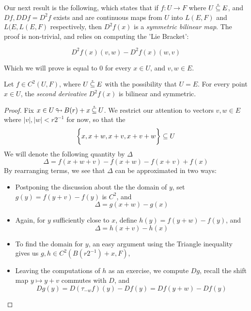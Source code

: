 \documentclass[../main-manifolds.tex]{subfiles}
\begin{document}
Our next result is the following, which states that if $f: U\to F$ where $U\:\mathring{\subseteq}\: E$, and $Df, DDf = D^2f$ exists and are continuous maps from $U$ into $L(E,F)$ and $L(E,L(E,F)$ respectively, then $D^2f(x)$ is a \emph{symmetric bilinear map}. The proof is non-trivial, and relies on computing the 'Lie Bracket':

\[
    D^2f(x)(v,w) - D^2f(x)(w,v)
\]

Which we will prove is equal to $0$ for every $x\in U$, and $v,w\in E$.

\begin{wts}
    Let $f\in C^2(U, F)$, where $U\:\mathring{\subseteq}\: E$ with the possibility that $U = E$. For every point $x\in U$, the \emph{second derivative} $D^2f(x)$ is bilinear and symmetric.
\end{wts}
\begin{proof}
    Fix $x\in U{\:\looparrowright\:} B(r) + x\:\mathring{\subseteq}\: U$. We restrict our attention to vectors $v,w\in E$ where $\vert v\vert, \vert w\vert < r2^{-1}$ for now, so that the
    \[
    \biggl\{{x, x+w, x+v, x+v+w}\biggr\}\subseteq U
    \]
    We will denote the following quantity by $\Delta$
    \[
        \Delta = f(x+w+v) - f(x+w) - f(x+v) + f(x)
    \]
    By rearranging terms, we see that $\Delta$ can be approximated in two ways:
    \begin{itemize}
        \item Postponing the discussion about the the domain of $y$, set $g(y) = f(y+v) - f(y)$ is $C^2$, and 
        \begin{equation}\label{second-derivative-Delta-g}
            \Delta = g(x+w) - g(x)
        \end{equation}
        \item Again, for $y$ sufficiently close to $x$, define $h(y) = f(y+w) - f(y)$, and
        \begin{equation}\label{second-derivative-Delta-h}
            \Delta = h(x+v) - h(x)
        \end{equation}
        \item To find the domain for $y$, an easy argument using the Triangle inequality gives us $g,h \in C^2(B(r2^{-1}) + x, F)$,
        \item Leaving the computations of $h$ as an exercise, we compute $Dg$, recall the shift map $y\mapsto y+v$ commutes with $D$, and
        \begin{equation}\label{second-derivative-Delta-Dg}
            Dg(y) = D(\tau_{-w}f)(y)  - Df(y) = Df(y+w) - Df(y)
        \end{equation}
    \end{itemize}


\end{proof}
\end{document}
